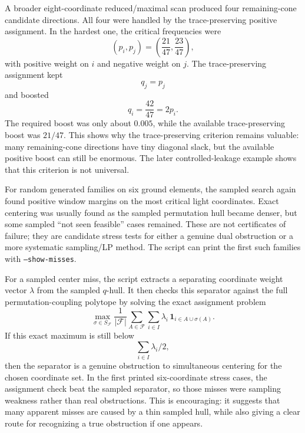 \documentclass[11pt]{article}
\begin{document}
A broader eight-coordinate reduced/maximal scan produced four remaining-cone
candidate directions.  All four were handled by the trace-preserving positive
assignment.  In the hardest one, the critical frequencies were
\[
  (p_i,p_j)=\left(\frac{21}{47},\frac{23}{47}\right),
\]
with positive weight on $i$ and negative weight on $j$.  The trace-preserving
assignment kept
\[
  q_j=p_j
\]
and boosted
\[
  q_i=\frac{42}{47}=2p_i.
\]
The required boost was only about $0.005$, while the available
trace-preserving boost was $21/47$.  This shows why the trace-preserving
criterion remains valuable: many remaining-cone directions have tiny diagonal
slack, but the available positive boost can still be enormous.  The later
controlled-leakage example shows that this criterion is not universal.

For random generated families on six ground elements, the sampled search again
found positive window margins on the most critical light coordinates.  Exact
centering was usually found as the sampled permutation hull became denser, but
some sampled ``not seen feasible'' cases remained.  These are not certificates
of failure; they are candidate stress tests for either a genuine dual
obstruction or a more systematic sampling/LP method.  The script can print the
first such families with \texttt{--show-misses}.

For a sampled center miss, the script extracts a separating coordinate weight
vector $\lambda$ from the sampled $q$-hull.  It then checks this separator
against the full permutation-coupling polytope by solving the exact assignment
problem
\[
  \max_{\sigma\in S_{\mathcal{F}}}
  \frac1{|\mathcal{F}|}
  \sum_{A\in\mathcal{F}}\sum_{i\in I}
  \lambda_i\,\mathbf{1}_{i\in A\cup\sigma(A)}.
\]
If this exact maximum is still below
\[
  \sum_{i\in I}\lambda_i/2,
\]
then the separator is a genuine obstruction to simultaneous centering for the
chosen coordinate set.  In the first printed six-coordinate stress cases, the
assignment check beat the sampled separator, so those misses were sampling
weakness rather than real obstructions.  This is encouraging: it suggests that
many apparent misses are caused by a thin sampled hull, while also giving a
clear route for recognizing a true obstruction if one appears.
\end{document}
